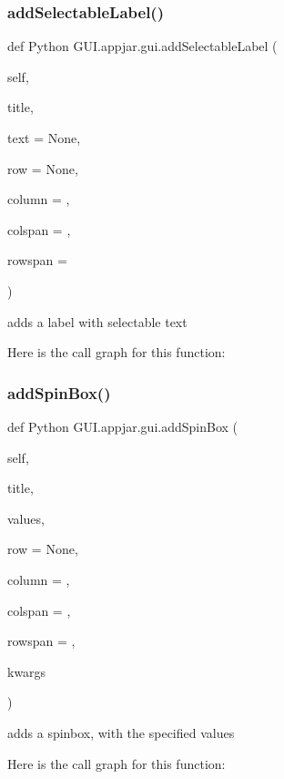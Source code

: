\subsubsection{\texorpdfstring{add\+Selectable\+Label()}{addSelectableLabel()}}
{\footnotesize\ttfamily def Python G\+U\+I.\+appjar.\+gui.\+add\+Selectable\+Label (\begin{DoxyParamCaption}\item[{}]{self,  }\item[{}]{title,  }\item[{}]{text = {\ttfamily None},  }\item[{}]{row = {\ttfamily None},  }\item[{}]{column = {},  }\item[{}]{colspan = {},  }\item[{}]{rowspan = {} }\end{DoxyParamCaption})}

\begin{DoxyVerb}adds a label with selectable text \end{DoxyVerb}
 Here is the call graph for this function\+:
\mbox{\label{class_python_01_g_u_i_1_1appjar_1_1gui_adcb21f0373bac433c28be4f4e31a2f09}} 
\subsubsection{\texorpdfstring{add\+Spin\+Box()}{addSpinBox()}}
{\footnotesize\ttfamily def Python G\+U\+I.\+appjar.\+gui.\+add\+Spin\+Box (\begin{DoxyParamCaption}\item[{}]{self,  }\item[{}]{title,  }\item[{}]{values,  }\item[{}]{row = {\ttfamily None},  }\item[{}]{column = {},  }\item[{}]{colspan = {},  }\item[{}]{rowspan = {},  }\item[{}]{kwargs }\end{DoxyParamCaption})}

\begin{DoxyVerb}adds a spinbox, with the specified values \end{DoxyVerb}
 Here is the call graph for this function\+:
\mbox{\label{class_python_01_g_u_i_1_1appjar_1_1gui_a1cab65af7f968f7935b0b7505a22f14c}} 

